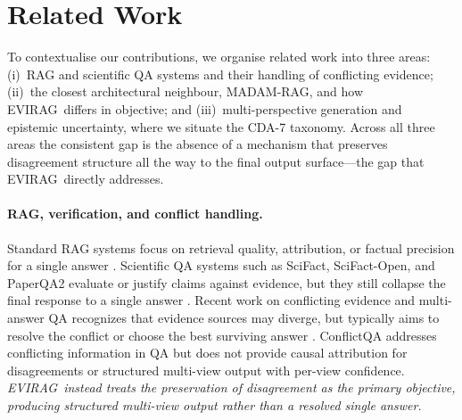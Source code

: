 \documentclass[11pt]{article}
\newcommand{\system}{\textsc{EVIRAG}\xspace}
\begin{document}
\section{Related Work}
\label{sec:related}

To contextualise our contributions, we organise related work into three
areas: (i)~RAG and scientific QA systems and their handling of conflicting
evidence; (ii)~the closest architectural neighbour, MADAM-RAG, and how
\system\ differs in objective; and (iii)~multi-perspective generation and
epistemic uncertainty, where we situate the CDA-7 taxonomy.
Across all three areas the consistent gap is the absence of a mechanism that
preserves disagreement structure all the way to the final output
surface---the gap that \system\ directly addresses.

\paragraph{RAG, verification, and conflict handling.}
Standard RAG systems focus on retrieval quality, attribution, or factual
precision for a single answer \citep{lewis2020rag,gao2023rarr,min2023factscore,
ru2024ragchecker}.  Scientific QA systems such as SciFact, SciFact-Open, and
PaperQA2 evaluate or justify claims against evidence, but they still collapse
the final response to a single answer
\citep{wadden2020scifact,wadden2022scifactopen,lala2023paperqa}.  Recent work
on conflicting evidence and multi-answer QA recognizes that evidence sources may
diverge, but typically aims to resolve the conflict or choose the best surviving
answer \citep{zhong2023romqa,wang2025conflicting,xie2024conflictqa}.
ConflictQA \citep{xie2024conflictqa} addresses conflicting information in QA
but does not provide causal attribution for disagreements or structured
multi-view output with per-view confidence.
\textit{\textup{\system}\ instead treats the preservation of disagreement as
the primary objective, producing structured multi-view output rather than a
resolved single answer.}
\end{document}
